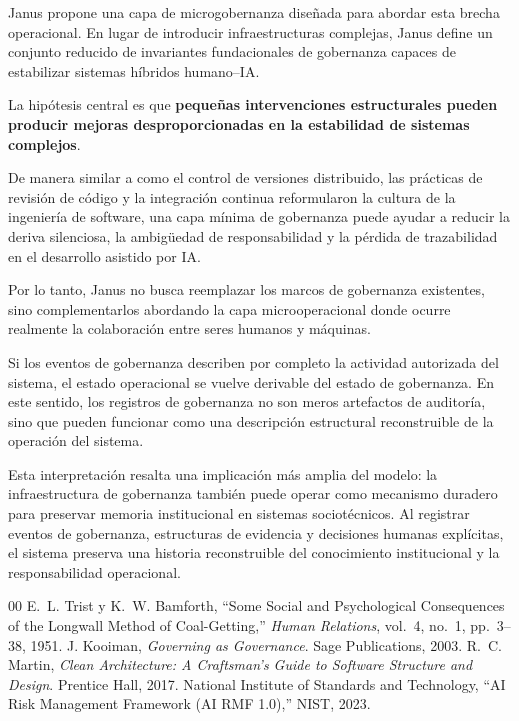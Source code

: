 \documentclass[conference]{IEEEtran}
\begin{document}
Janus propone una capa de microgobernanza diseñada para abordar esta brecha operacional. En lugar de introducir infraestructuras complejas, Janus define un conjunto reducido de invariantes fundacionales de gobernanza capaces de estabilizar sistemas híbridos humano--IA.

La hipótesis central es que \textbf{pequeñas intervenciones estructurales pueden producir mejoras desproporcionadas en la estabilidad de sistemas complejos}.

De manera similar a como el control de versiones distribuido, las prácticas de revisión de código y la integración continua reformularon la cultura de la ingeniería de software, una capa mínima de gobernanza puede ayudar a reducir la deriva silenciosa, la ambigüedad de responsabilidad y la pérdida de trazabilidad en el desarrollo asistido por IA.

Por lo tanto, Janus no busca reemplazar los marcos de gobernanza existentes, sino complementarlos abordando la capa microoperacional donde ocurre realmente la colaboración entre seres humanos y máquinas.

Si los eventos de gobernanza describen por completo la actividad autorizada del sistema, el estado operacional se vuelve derivable del estado de gobernanza. En este sentido, los registros de gobernanza no son meros artefactos de auditoría, sino que pueden funcionar como una descripción estructural reconstruible de la operación del sistema.

Esta interpretación resalta una implicación más amplia del modelo: la infraestructura de gobernanza también puede operar como mecanismo duradero para preservar memoria institucional en sistemas sociotécnicos. Al registrar eventos de gobernanza, estructuras de evidencia y decisiones humanas explícitas, el sistema preserva una historia reconstruible del conocimiento institucional y la responsabilidad operacional.

\begin{thebibliography}{00}
 E.~L. Trist y K.~W. Bamforth, ``Some Social and Psychological Consequences of the Longwall Method of Coal-Getting,'' \emph{Human Relations}, vol.~4, no.~1, pp.~3--38, 1951.
 J. Kooiman, \emph{Governing as Governance}. Sage Publications, 2003.
 R.~C. Martin, \emph{Clean Architecture: A Craftsman's Guide to Software Structure and Design}. Prentice Hall, 2017.
 National Institute of Standards and Technology, ``AI Risk Management Framework (AI RMF 1.0),'' NIST, 2023.
\end{thebibliography}
\end{document}
